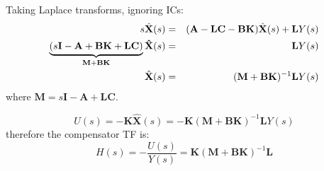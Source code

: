 Taking Laplace transforms, ignoring ICs:
\begin{eqnarray*}
s\hat{\mathbf{X}}(s) & = & (\mathbf{A} - \mathbf{LC} - \mathbf{BK})\hat{\mathbf{X}}(s) + \mathbf{L}Y(s) \\	
\underbrace {(s{\bf{I}} - {\bf{A}} + {\bf{BK}} + {\bf{LC}})}_{{\bf{M + BK}}}{\bf{\hat X}}(s) & = & {\bf{L}}Y(s) \\
\hat{\mathbf{X}}(s) & = & (\mathbf{M}+\mathbf{BK})^{-1}{\bf{L}}Y(s)
\end{eqnarray*}
where $\mathbf{M}=s\mathbf{I}-\mathbf{A}+\mathbf{LC}$.
 
\[
U(s)=-\mathbf{K}\hat{\mathbf{X}}(s)=-\mathbf{K}(\mathbf{M}+\mathbf{BK})^{-1}\mathbf{L}Y(s)
\]
therefore the compensator TF is:
\[
H(s)=-\frac{U(s)}{Y(s)}=\mathbf{K}(\mathbf{M}+\mathbf{BK})^{-1}\mathbf{L}
\]



\endinput


